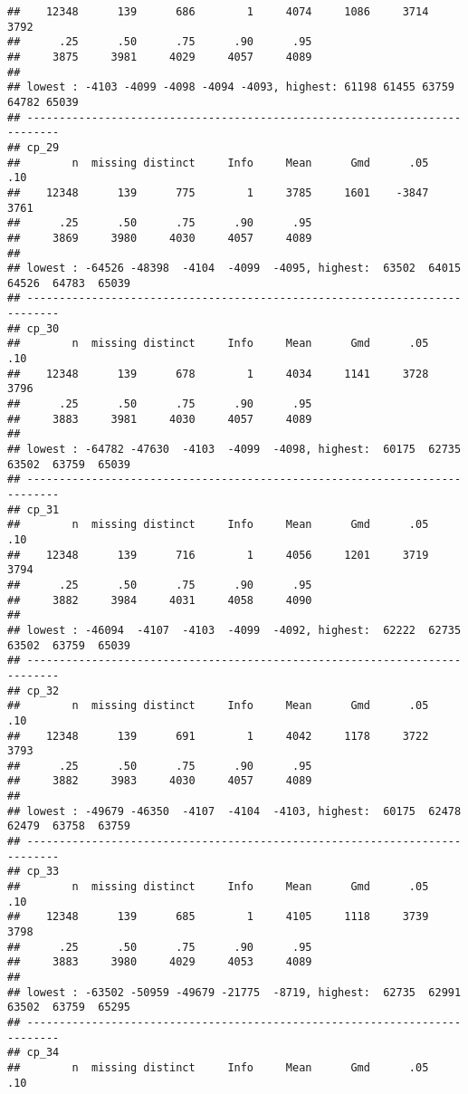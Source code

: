 \documentclass[]{article}
\begin{document}
\begin{verbatim}
##    12348      139      686        1     4074     1086     3714     3792 
##      .25      .50      .75      .90      .95 
##     3875     3981     4029     4057     4089 
## 
## lowest : -4103 -4099 -4098 -4094 -4093, highest: 61198 61455 63759 64782 65039
## ---------------------------------------------------------------------------
## cp_29 
##        n  missing distinct     Info     Mean      Gmd      .05      .10 
##    12348      139      775        1     3785     1601    -3847     3761 
##      .25      .50      .75      .90      .95 
##     3869     3980     4030     4057     4089 
## 
## lowest : -64526 -48398  -4104  -4099  -4095, highest:  63502  64015  64526  64783  65039
## ---------------------------------------------------------------------------
## cp_30 
##        n  missing distinct     Info     Mean      Gmd      .05      .10 
##    12348      139      678        1     4034     1141     3728     3796 
##      .25      .50      .75      .90      .95 
##     3883     3981     4030     4057     4089 
## 
## lowest : -64782 -47630  -4103  -4099  -4098, highest:  60175  62735  63502  63759  65039
## ---------------------------------------------------------------------------
## cp_31 
##        n  missing distinct     Info     Mean      Gmd      .05      .10 
##    12348      139      716        1     4056     1201     3719     3794 
##      .25      .50      .75      .90      .95 
##     3882     3984     4031     4058     4090 
## 
## lowest : -46094  -4107  -4103  -4099  -4092, highest:  62222  62735  63502  63759  65039
## ---------------------------------------------------------------------------
## cp_32 
##        n  missing distinct     Info     Mean      Gmd      .05      .10 
##    12348      139      691        1     4042     1178     3722     3793 
##      .25      .50      .75      .90      .95 
##     3882     3983     4030     4057     4089 
## 
## lowest : -49679 -46350  -4107  -4104  -4103, highest:  60175  62478  62479  63758  63759
## ---------------------------------------------------------------------------
## cp_33 
##        n  missing distinct     Info     Mean      Gmd      .05      .10 
##    12348      139      685        1     4105     1118     3739     3798 
##      .25      .50      .75      .90      .95 
##     3883     3980     4029     4053     4089 
## 
## lowest : -63502 -50959 -49679 -21775  -8719, highest:  62735  62991  63502  63759  65295
## ---------------------------------------------------------------------------
## cp_34 
##        n  missing distinct     Info     Mean      Gmd      .05      .10 

\end{verbatim}
\end{document}
